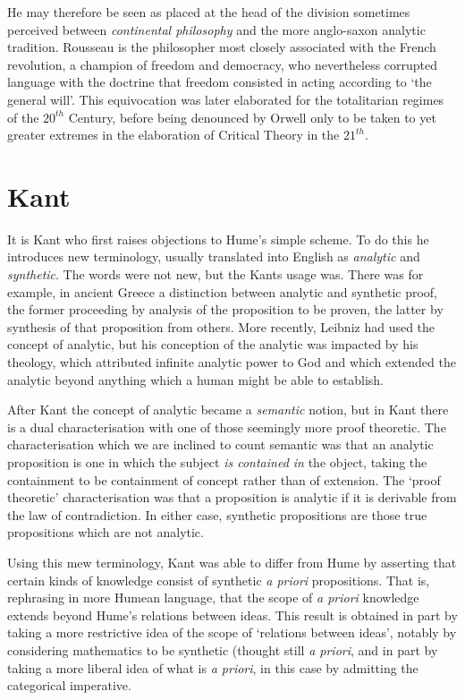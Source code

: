 \documentclass[10pt,titlepage]{article}
\begin{document}
He may therefore be seen as placed at the head of the division sometimes perceived between \emph{continental philosophy} and the more anglo-saxon analytic tradition.
Rousseau is the philosopher most closely associated with the French revolution, a champion of freedom and democracy, who nevertheless corrupted language with the doctrine that freedom consisted in acting according to `the general will'.
This equivocation was later elaborated for the totalitarian regimes of the $20^{th}$ Century, before being denounced by Orwell \cite{orwell-1984} only to be taken to yet greater extremes in the elaboration of Critical Theory in the $21^{th}$.


\section{Kant}

It is Kant who first raises objections to Hume's simple scheme.
To do this he introduces new terminology, usually translated into English as \emph{analytic} and \emph{synthetic}.
The words were not new, but the Kants usage was.
There was for example, in ancient Greece a distinction between analytic and synthetic proof, the former proceeding by analysis of the proposition to be proven, the latter by synthesis of that proposition from others.
More recently, Leibniz had used the concept of analytic, but his conception of the analytic was impacted by his theology, which attributed infinite analytic power to God and which extended the analytic beyond anything which a human might be able to establish.

After Kant the concept of analytic became a \emph{semantic} notion, but in Kant there is a dual characterisation with one of those seemingly more proof theoretic.
The characterisation which we are inclined to count semantic was that an analytic proposition is one in which the subject \emph{is contained in} the object, taking the containment to be containment of concept rather than of extension.
The `proof theoretic' characterisation was that a proposition is analytic if it is derivable from the law of contradiction.
In either case, synthetic propositions are those true propositions which are not analytic.

Using this mew terminology, Kant was able to differ from Hume by asserting that certain kinds of knowledge consist of synthetic \emph{a priori} propositions.
That is, rephrasing in more Humean language, that the scope of \emph{a priori} knowledge extends beyond Hume's relations between ideas.
This result is obtained in part by taking a more restrictive idea of the scope of `relations between ideas', notably by considering mathematics to be synthetic (thought still \emph{a priori}, and in part by taking a more liberal idea of what is \emph{a priori}, in this case by admitting the categorical imperative.
\end{document}

